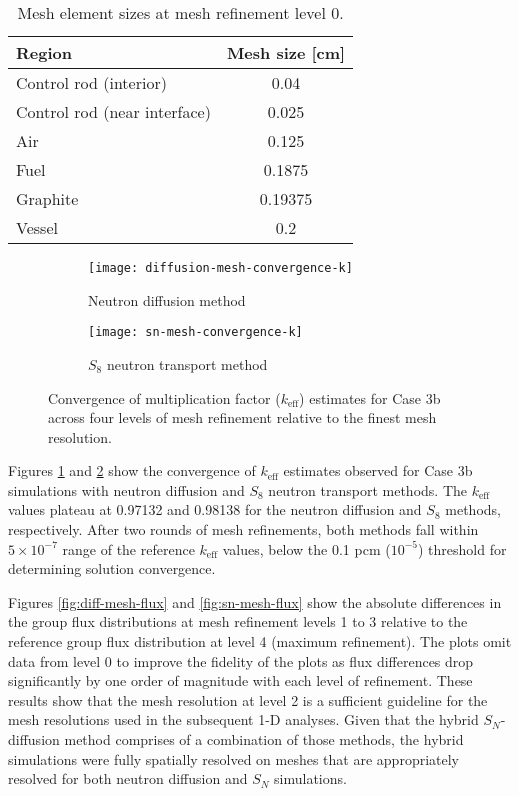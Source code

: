 \begin{table}[t]
  \centering
  \caption{Mesh element sizes at mesh refinement level 0.}
  \begin{tabular}{l S}
    \toprule
    Region & {Mesh size [cm]} \\
    \midrule
    Control rod (interior) & 0.04 \\
    Control rod (near interface) & 0.025 \\
    Air & 0.125 \\
    Fuel & 0.1875 \\
    Graphite & 0.19375 \\
    Vessel & 0.2 \\
    \bottomrule
  \end{tabular}
  \label{table:mesh-size}
\end{table}

\begin{figure}[t]
  \centering
  \begin{subfigure}[b]{0.48\columnwidth}
    \centering
    \texttt{[image: diffusion-mesh-convergence-k]}
    \caption{Neutron diffusion method}
    \label{fig:diff-mesh-k}
  \end{subfigure}
  \hfill
  \begin{subfigure}[b]{0.48\columnwidth}
    \centering
    \texttt{[image: sn-mesh-convergence-k]}
    \caption{$S_8$ neutron transport method}
    \label{fig:sn-mesh-k}
  \end{subfigure}
  \caption{Convergence of multiplication factor ($k_\text{eff}$) estimates for Case 3b across four
    levels of mesh refinement relative to the finest mesh resolution.}
  \label{fig:mesh-k}
\end{figure}

Figures \ref{fig:diff-mesh-k} and \ref{fig:sn-mesh-k} show the convergence of $k_\text{eff}$
estimates observed for Case 3b simulations with neutron diffusion and $S_8$ neutron transport
methods. The $k_\text{eff}$ values plateau at 0.97132 and 0.98138 for the neutron diffusion and
$S_8$ methods, respectively. After two rounds of mesh refinements, both methods fall within
$5\times 10^{-7}$ range of the reference $k_\text{eff}$ values, below the 0.1 pcm ($10^{-5}$)
threshold for determining solution convergence.

Figures \ref{fig:diff-mesh-flux} and \ref{fig:sn-mesh-flux} show the absolute differences in the
group flux distributions at mesh refinement levels 1 to 3 relative to the reference group flux
distribution at level 4 (maximum refinement). The plots omit data from level 0 to improve the fidelity
of the plots as flux differences drop significantly by one order of magnitude with each level of
refinement.
These results show that the mesh resolution at level 2 is a sufficient guideline for
the mesh resolutions used in the subsequent 1-D analyses. Given that the hybrid $S_N$-diffusion
method comprises of a combination of those
methods, the hybrid simulations were fully spatially resolved on meshes that are
appropriately resolved for both neutron diffusion and $S_N$ simulations.

